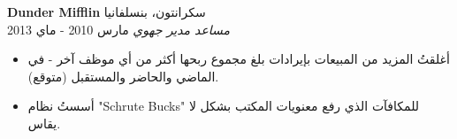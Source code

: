 \foreignlanguage{english}{\textbf{Dunder Mifflin}} \hfill سكرانتون، بنسلفانيا\\
\textit{مساعد مدير جهوي} \hfill مارس 2010 - ماي 2013\\
\vspace{-1mm}
\begin{itemize}
	\item أغلقتُ المزيد من المبيعات بإيرادات بلغ مجموع ربحها أكثر من أي موظف آخر - في الماضي والحاضر والمستقبل (متوقع).
	\item أسستُ نظام \foreignlanguage{english}{"Schrute Bucks"} للمكافآت الذي رفع معنويات المكتب بشكل لا يقاس.
\end{itemize}